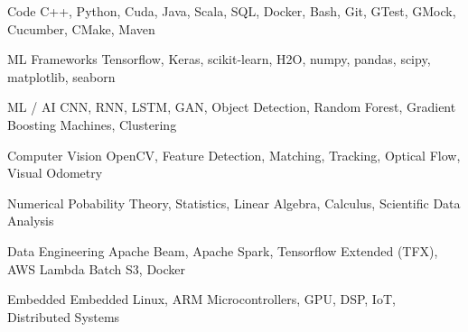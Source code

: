 

\begin{cvskills}

\cvskill
    {Code} %
    {C++, Python, Cuda, Java, Scala, SQL, Docker, Bash, Git, GTest, GMock, Cucumber, CMake, Maven} %


\cvskill
    {ML Frameworks} %
    {Tensorflow, Keras, scikit-learn, H2O, numpy, pandas, scipy, matplotlib, seaborn} %

\cvskill
    {ML / AI} %
    {CNN, RNN, LSTM, GAN, Object Detection, Random Forest, Gradient Boosting Machines, Clustering} %

\cvskill
    {Computer Vision} %
    {OpenCV, Feature Detection, Matching, Tracking, Optical Flow, Visual Odometry} %

\cvskill
    {Numerical} %
    {Pobability Theory, Statistics, Linear Algebra, Calculus, Scientific Data Analysis} %

\cvskill
    {Data Engineering} %
    {Apache Beam, Apache Spark, Tensorflow Extended (TFX), AWS Lambda Batch S3, Docker} %


\cvskill
    {Embedded} %
    {Embedded Linux, ARM Microcontrollers, GPU, DSP, IoT, Distributed Systems} %

\end{cvskills}